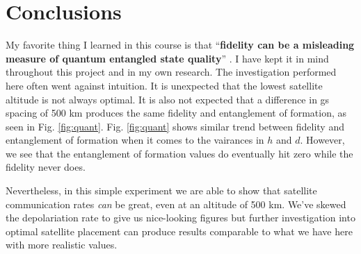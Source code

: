 \vspace*{-0.5cm}
\section{Conclusions}

My favorite thing I learned in this course is that ``\textbf{fidelity can be a misleading measure of quantum entangled state quality}'' \cite{vardoyan2025}. I have kept it in mind throughout this project and in my own research. The investigation performed here often went against intuition. It is unexpected that the lowest satellite altitude is not always optimal. It is also not expected that a difference in gs spacing of 500 km produces the same fidelity and entanglement of formation, as seen in Fig. \ref{fig:quant}. Fig. \ref{fig:quant} shows similar trend between fidelity and entanglement of formation when it comes to the vairances in \(h\) and \(d\). However, we see that the entanglement of formation values do eventually hit zero while the fidelity never does.

Nevertheless, in this simple experiment we are able to show that satellite communication rates \textit{can} be great, even at an altitude of 500 km. We've skewed the depolariation rate to give us nice-looking figures but further investigation into optimal satellite placement can produce results comparable to what we have here with more realistic values.
